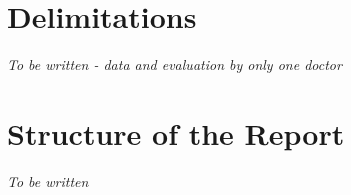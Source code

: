 \section{Delimitations}
\label{sec:delimitations}

\textit{To be written - data and evaluation by only one doctor}

\section{Structure of the Report}
\label{sec:structure}

\textit{To be written}